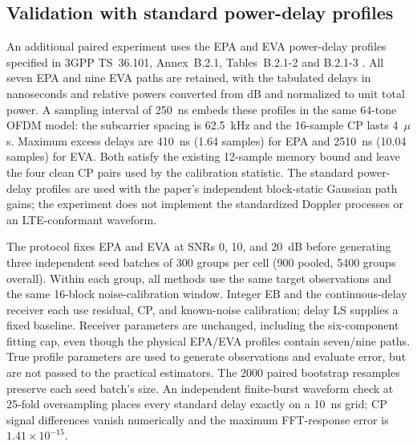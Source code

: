 \subsection{Validation with standard power-delay profiles}
\label{sec:standard_design}
An additional paired experiment uses the EPA and EVA power-delay profiles
specified in 3GPP TS~36.101, Annex~B.2.1, Tables~B.2.1-2 and B.2.1-3
\cite{etsi2010epa_eva}. All seven EPA and nine EVA paths are retained, with
the tabulated delays in nanoseconds and relative powers converted from dB
and normalized to unit total power. A sampling interval of 250~ns embeds
these profiles in the same 64-tone OFDM model: the subcarrier spacing is
62.5~kHz and the 16-sample CP lasts 4~$\mu$s. Maximum excess delays are
410~ns (1.64 samples) for EPA and 2510~ns (10.04 samples) for EVA. Both
satisfy the existing 12-sample memory bound and leave the four clean CP
pairs used by the calibration statistic. The standard power-delay profiles
are used with the paper's independent block-static Gaussian path gains;
the experiment does not implement the standardized Doppler processes or
an LTE-conformant waveform.

The protocol fixes EPA and EVA at SNRs 0, 10, and 20~dB before generating
three independent seed batches of 300 groups per cell (900 pooled,
5400 groups overall). Within each group, all methods use the same target
observations and the same 16-block noise-calibration window. Integer EB
and the continuous-delay receiver each use residual, CP, and known-noise
calibration; delay LS supplies a fixed baseline. Receiver parameters are
unchanged, including the six-component fitting cap, even though the physical
EPA/EVA profiles contain seven/nine paths. True profile parameters are used
to generate observations and evaluate error, but are not passed to the
practical estimators. The 2000 paired bootstrap resamples preserve each
seed batch's size. An independent finite-burst waveform check at
25-fold oversampling places every standard delay exactly on a 10~ns grid;
CP signal differences vanish numerically and the maximum FFT-response
error is $1.41\times10^{-15}$.
